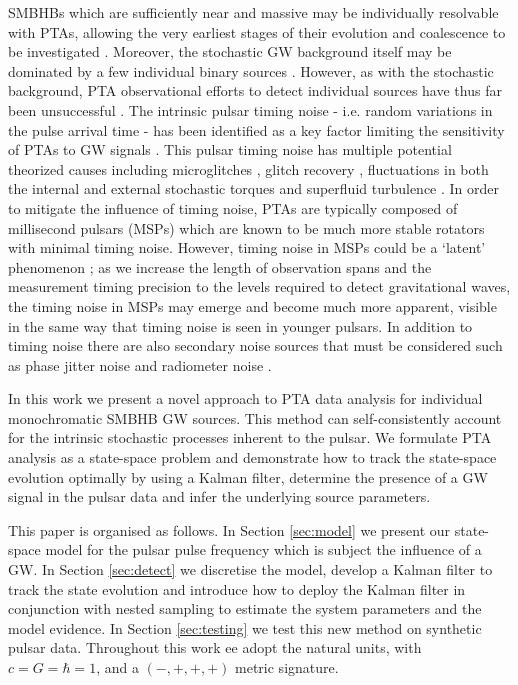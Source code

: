 \documentclass[fleqn,usenatbib,useAMS]{mnras}
\begin{document}
SMBHBs which are sufficiently near and massive may be individually resolvable with PTAs, allowing the very earliest stages of their evolution and coalescence to be investigated \citep{Sesana2010,Zhu10,Babak2012,2013CQGra..30v4004E,Zhupulsarterms}. 
Moreover, the stochastic GW background itself may be dominated by a few individual binary sources \citep{Ravi2012singlesource}. However, as with the stochastic background, PTA observational efforts to detect individual sources have thus far been unsuccessful \citep{Zhu2014PPTA,Babak2016,Arzoumanian2023}. The intrinsic pulsar timing noise - i.e.  random variations in the pulse arrival time - has been identified as a key factor limiting the sensitivity of PTAs to GW signals \citep{Shannon2010,Lasky2015,Caballero2016}. This pulsar timing noise has multiple potential theorized causes including microglitches \citep{Melatos2008}, glitch recovery \citep{Hobbs2010glitch}, fluctuations in both the internal and external stochastic torques \citep{Antonelli2023} and superfluid turbulence \citep{Melatos2014}. In order to mitigate the influence of timing noise, PTAs are typically composed of millisecond pulsars (MSPs) which are known to be much more stable rotators with minimal timing noise. However, timing noise in MSPs could be a `latent' phenomenon \citep{Shannon2010}; as we increase the length of observation spans and the measurement timing precision to the levels required to detect gravitational waves, the timing noise in MSPs may emerge and become much more apparent, visible in the same way that timing noise is seen in younger pulsars. In addition to timing noise there are also secondary noise sources that must be considered such as phase jitter noise and radiometer noise \citep{Cordes2010,Lam2019,Parthasarathy2021}. \newline 

 
In this work we present a novel approach to PTA data analysis for individual monochromatic SMBHB GW sources. This method can self-consistently account for the intrinsic stochastic processes inherent to the pulsar. We formulate PTA analysis as a state-space problem and demonstrate how to track the state-space evolution optimally by using a Kalman filter, determine the presence of a GW signal in the pulsar data and infer the underlying source parameters.  \newline 
 

\noindent This paper is organised as follows. In Section \ref{sec:model} we present our state-space model for the pulsar pulse frequency which is subject the influence of a GW. In Section \ref{sec:detect} we discretise the model, develop a Kalman filter to track the state evolution and introduce how to deploy the Kalman filter in conjunction with nested sampling to estimate the system parameters and the model evidence. In Section \ref{sec:testing} we test this new method on synthetic pulsar data. Throughout this work ee adopt the natural units, with $c = G = \hbar = 1$, and a $(-,+,+,+)$ metric signature. \newline 
\end{document}
